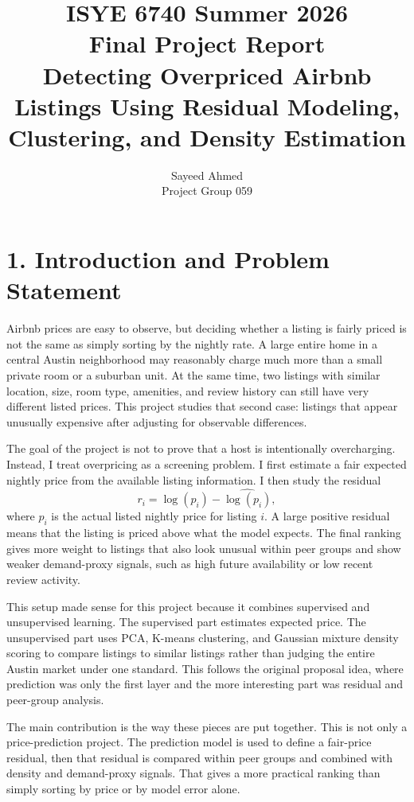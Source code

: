 \documentclass[11pt]{article}
\title{ISYE 6740 Summer 2026\\Final Project Report\\Detecting Overpriced Airbnb Listings Using Residual Modeling, Clustering, and Density Estimation}
\author{Sayeed Ahmed\\Project Group 059}
\date{}
\begin{document}
\maketitle

\section*{1. Introduction and Problem Statement}

Airbnb prices are easy to observe, but deciding whether a listing is fairly priced is not the same as simply sorting by the nightly rate. A large entire home in a central Austin neighborhood may reasonably charge much more than a small private room or a suburban unit. At the same time, two listings with similar location, size, room type, amenities, and review history can still have very different listed prices. This project studies that second case: listings that appear unusually expensive after adjusting for observable differences.

The goal of the project is not to prove that a host is intentionally overcharging. Instead, I treat overpricing as a screening problem. I first estimate a fair expected nightly price from the available listing information. I then study the residual
\[
 r_i = \log(p_i)-\widehat{\log(p_i)},
\]
where $p_i$ is the actual listed nightly price for listing $i$. A large positive residual means that the listing is priced above what the model expects. The final ranking gives more weight to listings that also look unusual within peer groups and show weaker demand-proxy signals, such as high future availability or low recent review activity.

This setup made sense for this project because it combines supervised and unsupervised learning. The supervised part estimates expected price. The unsupervised part uses PCA, K-means clustering, and Gaussian mixture density scoring to compare listings to similar listings rather than judging the entire Austin market under one standard. This follows the original proposal idea, where prediction was only the first layer and the more interesting part was residual and peer-group analysis.

The main contribution is the way these pieces are put together. This is not only a price-prediction project. The prediction model is used to define a fair-price residual, then that residual is compared within peer groups and combined with density and demand-proxy signals. That gives a more practical ranking than simply sorting by price or by model error alone.
\end{document}
